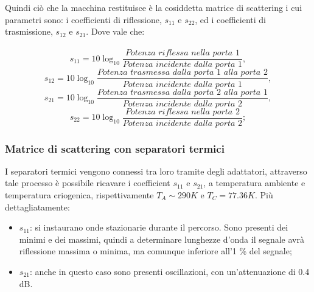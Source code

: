 Quindi ciò che la macchina restituisce è la cosiddetta matrice di scattering i cui parametri sono: i coefficienti di riflessione, \textit{$s_{11}$} e \textit{$s_{22}$}, ed i coefficienti di trasmissione, \textit{$s_{12}$} e \textit{$s_{21}$}. Dove vale che:\\\\
\begin{equation}
    s_{11}=10\log_{10} \frac{Potenza\,\,riflessa\,\,nella\,\,porta\,\,1}{Potenza\,\,incidente\,\,dalla\,\,porta\,\,1},
\end{equation}
\begin{equation}
    s_{12}=10\log_{10} \frac{Potenza\,\,trasmessa\,\,dalla\,\,porta\,\,1\,\,alla\,\,porta\,\,2}{Potenza\,\,incidente\,\,dalla\,\,porta\,\,1},
\end{equation}
\begin{equation}
    s_{21}=10\log_{10} \frac{Potenza\,\,trasmessa\,\,dalla\,\,porta\,\,2\,\,alla\,\,porta\,\,1}{Potenza\,\,incidente\,\,dalla\,\,porta\,\,2},
\end{equation}
\begin{equation}
    s_{22}=10\log_{10} \frac{Potenza\,\,riflessa\,\,nella\,\,porta\,\,2}{Potenza\,\,incidente\,\,dalla\,\,porta\,\,2};
\end{equation}



\subsubsection{Matrice di scattering con separatori termici}
\label{ssec:Matrice di scattering con separatori termici}

I separatori termici vengono connessi tra loro tramite degli adattatori, attraverso tale processo è possibile ricavare i coefficient $ s_{11} $ e $ s_{21} $, a temperatura ambiente e temperatura criogenica, rispettivamente $ T_{A}\sim290K $ e $ T_{C} = 77.36K $. Più dettagliatamente:

\begin{itemize}
\item $s_{11}$: si instaurano onde stazionarie durante il percorso. Sono presenti dei minimi e dei massimi, quindi a determinare lunghezze d'onda il segnale avrà riflessione massima o minima, ma comunque inferiore all'1 \% del segnale;
\item $s_{21}$: anche in questo caso sono presenti oscillazioni, con un'attenuazione di 0.4 dB.
\end{itemize}

